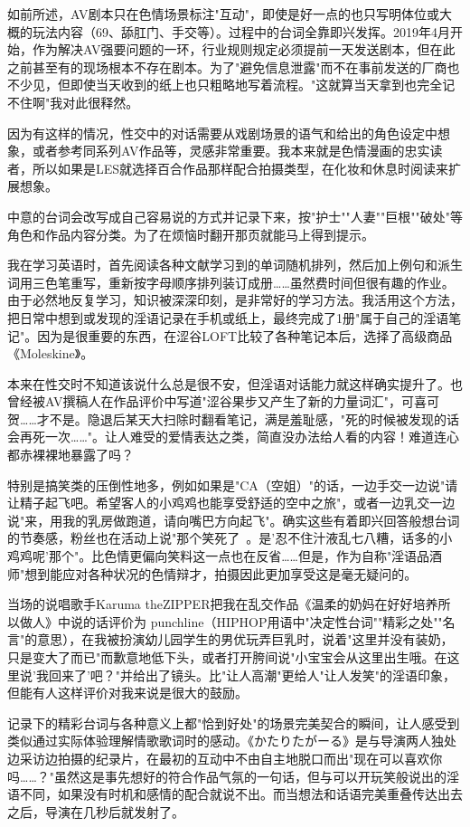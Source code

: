 \documentclass[12pt,UTF8]{ctexbook}
\begin{document}
如前所述，AV剧本只在色情场景标注"互动"，即使是好一点的也只写明体位或大概的玩法内容（69、舔肛门、手交等）。过程中的台词全靠即兴发挥。2019年4月开始，作为解决AV强要问题的一环，行业规则规定必须提前一天发送剧本，但在此之前甚至有的现场根本不存在剧本。为了"避免信息泄露"而不在事前发送的厂商也不少见，但即使当天收到的纸上也只粗略地写着流程。"这就算当天拿到也完全记不住啊"我对此很释然。

因为有这样的情况，性交中的对话需要从戏剧场景的语气和给出的角色设定中想象，或者参考同系列AV作品等，灵感非常重要。我本来就是色情漫画的忠实读者，所以如果是LES就选择百合作品那样配合拍摄类型，在化妆和休息时阅读来扩展想象。

中意的台词会改写成自己容易说的方式并记录下来，按"护士""人妻""巨根""破处"等角色和作品内容分类。为了在烦恼时翻开那页就能马上得到提示。

我在学习英语时，首先阅读各种文献学习到的单词随机排列，然后加上例句和派生词用三色笔重写，重新按字母顺序排列装订成册……虽然费时间但很有趣的作业。由于必然地反复学习，知识被深深印刻，是非常好的学习方法。我活用这个方法，把日常中想到或发现的淫语记录在手机或纸上，最终完成了1册"属于自己的淫语笔记"。因为是很重要的东西，在涩谷LOFT比较了各种笔记本后，选择了高级商品《Moleskine》。

本来在性交时不知道该说什么总是很不安，但淫语对话能力就这样确实提升了。也曾经被AV撰稿人在作品评价中写道"涩谷果步又产生了新的力量词汇"，可喜可贺……才不是。隐退后某天大扫除时翻看笔记，满是羞耻感，"死的时候被发现的话会再死一次……"。让人难受的爱情表达之类，简直没办法给人看的内容！难道连心都赤裸裸地暴露了吗？

特别是搞笑类的压倒性地多，例如如果是"CA（空姐）"的话，一边手交一边说"请让精子起飞吧。希望客人的小鸡鸡也能享受舒适的空中之旅"，或者一边乳交一边说"来，用我的乳房做跑道，请向嘴巴方向起飞"。确实这些有着即兴回答般想台词的节奏感，粉丝也在活动上说"那个笑死了~。是'忍不住汁液乱七八糟，话多的小鸡鸡呢'那个"。比色情更偏向笑料这一点也在反省……但是，作为自称"淫语品酒师"想到能应对各种状况的色情辩才，拍摄因此更加享受这是毫无疑问的。

当场的说唱歌手Karuma theZIPPER把我在乱交作品《温柔的奶妈在好好培养所以做人》中说的话评价为 punchline（HIPHOP用语中"决定性台词""精彩之处""名言"的意思），在我被扮演幼儿园学生的男优玩弄巨乳时，说着"这里并没有装奶，只是变大了而已"而歉意地低下头，或者打开胯间说"小宝宝会从这里出生哦。在这里说'我回来了'吧？"并给出了镜头。比"让人高潮"更给人"让人发笑"的淫语印象，但能有人这样评价对我来说是很大的鼓励。

记录下的精彩台词与各种意义上都"恰到好处"的场景完美契合的瞬间，让人感受到类似通过实际体验理解情歌歌词时的感动。《かたりたがーる》是与导演两人独处边采访边拍摄的纪录片，在最初的互动中不由自主地脱口而出"现在可以喜欢你吗……？"虽然这是事先想好的符合作品气氛的一句话，但与可以开玩笑般说出的淫语不同，如果没有时机和感情的配合就说不出。而当想法和话语完美重叠传达出去之后，导演在几秒后就发射了。
\end{document}
